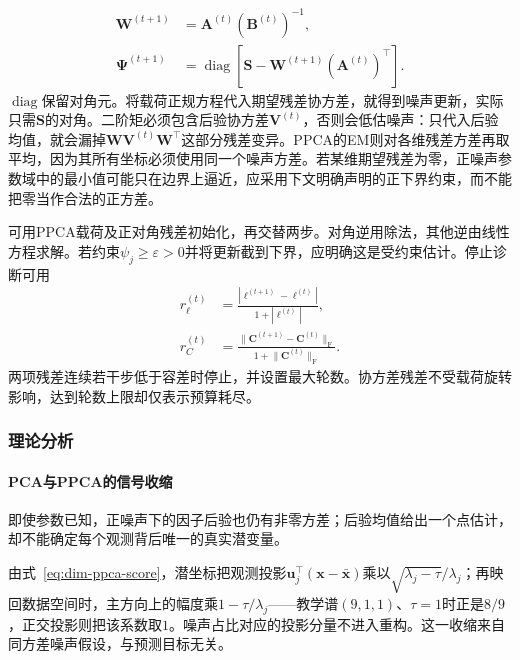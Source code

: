 \begin{equation}
\label{eq:dim-fa-mstep}
\begin{aligned}
\bm{W}^{(t+1)}&=\bm{A}^{(t)}(\bm{B}^{(t)})^{-1},\\
\bm{\Psi}^{(t+1)}
&=\operatorname{diag}\left[
\bm{S}-\bm{W}^{(t+1)}(\bm{A}^{(t)})^\top
\right].
\end{aligned}
\end{equation}
$\operatorname{diag}$保留对角元。将载荷正规方程代入期望残差协方差，就得到噪声更新，实际只需$\bm{S}$的对角。二阶矩必须包含后验协方差$\bm{V}^{(t)}$，否则会低估噪声：只代入后验均值，就会漏掉$\bm W\bm V^{(t)}\bm W^\top$这部分残差变异。PPCA的EM则对各维残差方差再取平均，因为其所有坐标必须使用同一个噪声方差。若某维期望残差为零，正噪声参数域中的最小值可能只在边界上逼近，应采用下文明确声明的正下界约束，而不能把零当作合法的正方差。

可用PPCA载荷及正对角残差初始化，再交替两步。对角逆用除法，其他逆由线性方程求解。若约束$\psi_j\geq\varepsilon>0$并将更新截到下界，应明确这是受约束估计。停止诊断可用
\begin{equation}
\label{eq:dim-fa-stopping}
\begin{aligned}
r_\ell^{(t)}
&=\frac{|\ell^{(t+1)}-\ell^{(t)}|}{1+|\ell^{(t)}|},\\
r_C^{(t)}
&=\frac{\lVert\bm{C}^{(t+1)}-\bm{C}^{(t)}\rVert_{\mathrm{F}}}
{1+\lVert\bm{C}^{(t)}\rVert_{\mathrm{F}}}.
\end{aligned}
\end{equation}
两项残差连续若干步低于容差时停止，并设置最大轮数。协方差残差不受载荷旋转影响，达到轮数上限却仅表示预算耗尽。

\subsubsection{理论分析}

\paragraph{PCA与PPCA的信号收缩}

即使参数已知，正噪声下的因子后验也仍有非零方差；后验均值给出一个点估计，却不能确定每个观测背后唯一的真实潜变量。

由式~\eqref{eq:dim-ppca-score}，潜坐标把观测投影$\bm{u}_j^\top(\bm{x}-\bar{\bm{x}})$乘以$\sqrt{\lambda_j-\tau}/\lambda_j$；再映回数据空间时，主方向上的幅度乘$1-\tau/\lambda_j$——教学谱$(9,1,1)$、$\tau=1$时正是$8/9$，正交投影则把该系数取$1$。噪声占比对应的投影分量不进入重构。这一收缩来自同方差噪声假设，与预测目标无关。

